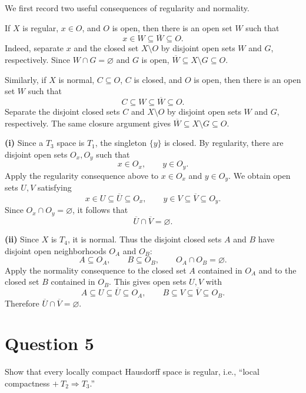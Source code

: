 \documentclass{article}
\begin{document}
\begin{solution}
  We first record two useful consequences of regularity and normality.

  If $X$ is regular, $x\in O$, and $O$ is open, then there is an open set
  $W$ such that
  \[
    x\in W\subseteq\overline{W}\subseteq O.
  \]
  Indeed, separate $x$ and the closed set $X\setminus O$ by disjoint open
  sets $W$ and $G$, respectively. Since $W\cap G=\varnothing$ and $G$ is
  open, $\overline{W}\subseteq X\setminus G\subseteq O$.

  Similarly, if $X$ is normal, $C\subseteq O$, $C$ is closed, and $O$ is
  open, then there is an open set $W$ such that
  \[
    C\subseteq W\subseteq\overline{W}\subseteq O.
  \]
  Separate the disjoint closed sets $C$ and $X\setminus O$ by disjoint open
  sets $W$ and $G$, respectively. The same closure argument gives
  $\overline{W}\subseteq X\setminus G\subseteq O$.

  \textbf{(i)} Since a $T_3$ space is $T_1$, the singleton $\{y\}$ is
  closed. By regularity, there are disjoint open sets $O_x,O_y$ such that
  \[
    x\in O_x,\qquad y\in O_y.
  \]
  Apply the regularity consequence above to $x\in O_x$ and $y\in O_y$.
  We obtain open sets $U,V$ satisfying
  \[
    x\in U\subseteq\overline{U}\subseteq O_x,
    \qquad
    y\in V\subseteq\overline{V}\subseteq O_y.
  \]
  Since $O_x\cap O_y=\varnothing$, it follows that
  \[
    \overline{U}\cap\overline{V}=\varnothing.
  \]

  \textbf{(ii)} Since $X$ is $T_4$, it is normal. Thus the disjoint closed
  sets $A$ and $B$ have disjoint open neighborhoods $O_A$ and $O_B$:
  \[
    A\subseteq O_A,\qquad B\subseteq O_B,\qquad O_A\cap O_B=\varnothing.
  \]
  Apply the normality consequence to the closed set $A$ contained in $O_A$
  and to the closed set $B$ contained in $O_B$. This gives open sets $U,V$
  with
  \[
    A\subseteq U\subseteq\overline{U}\subseteq O_A,
    \qquad
    B\subseteq V\subseteq\overline{V}\subseteq O_B.
  \]
  Therefore $\overline{U}\cap\overline{V}=\varnothing$.
\end{solution}

\section{Question 5}

Show that every locally compact Hausdorff space is regular, i.e.,
``local compactness $+\ T_2\Rightarrow T_3$.''
\end{document}
